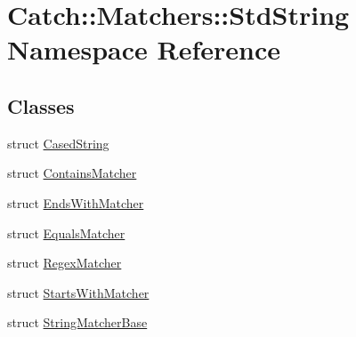\hypertarget{namespace_catch_1_1_matchers_1_1_std_string}{}\section{Catch\+::Matchers\+::Std\+String Namespace Reference}
\label{namespace_catch_1_1_matchers_1_1_std_string}
\subsection*{Classes}
\begin{DoxyCompactItemize}
\item 
struct \mbox{\hyperlink{struct_catch_1_1_matchers_1_1_std_string_1_1_cased_string}{Cased\+String}}
\item 
struct \mbox{\hyperlink{struct_catch_1_1_matchers_1_1_std_string_1_1_contains_matcher}{Contains\+Matcher}}
\item 
struct \mbox{\hyperlink{struct_catch_1_1_matchers_1_1_std_string_1_1_ends_with_matcher}{Ends\+With\+Matcher}}
\item 
struct \mbox{\hyperlink{struct_catch_1_1_matchers_1_1_std_string_1_1_equals_matcher}{Equals\+Matcher}}
\item 
struct \mbox{\hyperlink{struct_catch_1_1_matchers_1_1_std_string_1_1_regex_matcher}{Regex\+Matcher}}
\item 
struct \mbox{\hyperlink{struct_catch_1_1_matchers_1_1_std_string_1_1_starts_with_matcher}{Starts\+With\+Matcher}}
\item 
struct \mbox{\hyperlink{struct_catch_1_1_matchers_1_1_std_string_1_1_string_matcher_base}{String\+Matcher\+Base}}
\end{DoxyCompactItemize}
